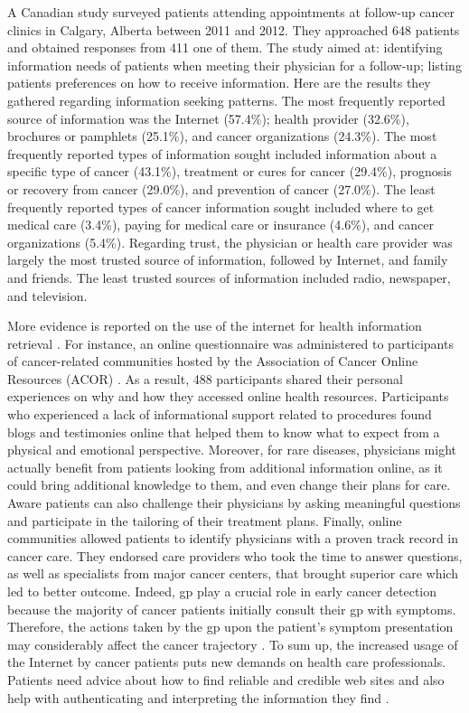 A Canadian study surveyed patients attending appointments at follow-up cancer
clinics in Calgary, Alberta \cite{sheabudgell_information_2014} between 2011 and
2012. They approached 648 patients and obtained responses from 411 one of them.
The study aimed at: identifying information needs of patients when meeting their
physician for a follow-up; listing patients preferences on how to receive
information. Here are the results they gathered regarding information seeking
patterns. The most frequently reported source of information was the Internet
(57.4\%); health provider (32.6\%), brochures or pamphlets (25.1\%), and cancer
organizations (24.3\%). The most frequently reported types of information sought
included information about a specific type of cancer (43.1\%), treatment or
cures for cancer (29.4\%), prognosis or recovery from cancer (29.0\%), and
prevention of cancer (27.0\%). The least frequently reported types of cancer
information sought included where to get medical care (3.4\%), paying for
medical care or insurance (4.6\%), and cancer organizations (5.4\%). Regarding
trust, the physician or health care provider was largely the most trusted source
of information, followed by Internet, and family and friends. The least trusted
sources of information included radio, newspaper, and television.

More evidence is reported on the use of the internet for health information
retrieval
\cite{chen_impact_2001,pereira_internet_2000,ziebland_how_2004,dolce_internet_2011}.
For instance, an online questionnaire was administered to participants of
cancer-related communities hosted by the Association of Cancer Online Resources
(ACOR) \cite{dolce_internet_2011}. As a result, 488 participants shared their
personal experiences on why and how they accessed online health resources.
Participants who experienced a lack of informational support related to
procedures found blogs and testimonies online that helped them to know what to
expect from a physical and emotional perspective. Moreover, for rare diseases,
physicians might actually benefit from patients looking from additional
information online, as it could bring additional knowledge to them, and even
change their plans for care. Aware patients can also challenge their physicians
by asking meaningful questions and participate in the tailoring of their
treatment plans. Finally, online communities allowed patients to identify
physicians with a proven track record in cancer care. They endorsed care
providers who took the time to answer questions, as well as specialists from
major cancer centers, that brought superior care which led to better outcome.
Indeed, \ac{gp} play a crucial role in early cancer detection because the
majority of cancer patients initially consult their \ac{gp} with symptoms.
Therefore, the actions taken by the \ac{gp} upon the patient's symptom
presentation may considerably affect the cancer trajectory
\cite{flytkjaer_virgilsen_cancer_2019}. To sum up, the increased usage of the
Internet by cancer patients puts new demands on health care professionals.
Patients need advice about how to find reliable and credible web sites and also
help with authenticating and interpreting the information they find
\cite{carlsson_cancer_2009}.

